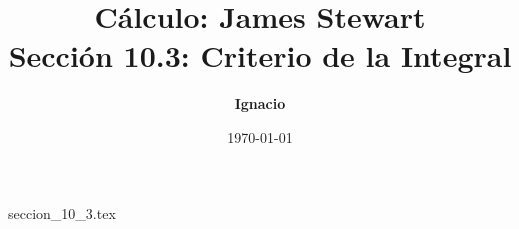 \documentclass[11pt,spanish,oneside]{report}
\title{\textbf{Cálculo: James Stewart} \\ \Large Sección 10.3: Criterio de la Integral}
\author{\textbf{Ignacio}}
\date{\today}
\begin{document}
\maketitle

{seccion_10_3.tex}
\end{document}
